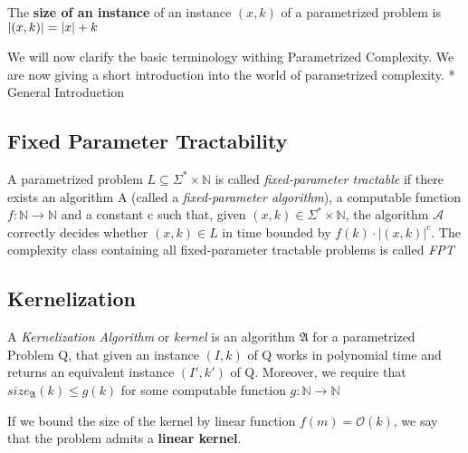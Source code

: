 \begin{definition}
    The \textbf{size of an instance} of an instance $(x,k)$ of a parametrized problem is $\abs{(x,k)} = \abs{x} + k$
\end{definition}
We will now clarify the basic terminology withing Parametrized Complexity. 
We are now giving a short introduction into the world of parametrized complexity. 
* General Introduction


\subsection{Fixed Parameter Tractability}

\begin{definition} 
    A parametrized problem $L\subseteq\Sigma^*\times\mathbb{N}$ is called \textit{fixed-parameter tractable} if there exists an algorithm A (called a \textit{fixed-parameter algorithm}), a computable function $f:\mathbb{N} \rightarrow \mathbb{N}$ and a constant c such that, given $(x,k) \in \Sigma^* \times \mathbb{N}$, the algorithm $\mathcal{A}$ correctly decides whether $(x,k) \in L$ in time bounded by $f(k) \cdot |(x,k)|^c$. The complexity class containing all fixed-parameter tractable problems is called \textit{FPT}
\end{definition}


\subsection{Kernelization}

\begin{definition}
A \textit{Kernelization Algorithm} or \textit{kernel} is an algorithm $\mathfrak{A}$ for a parametrized Problem Q, that given an instance $(I,k)$ of Q works in polynomial time and returns an equivalent instance $(I', k')$ of Q. Moreover, we require that $size_{\mathfrak{A}}(k) \leq g(k)$ for some computable function $g:\mathbb{N} \rightarrow \mathbb{N}$
\end{definition}

If we bound the size of the kernel by linear function $f(m) = \mathcal{O}(k)$, we say that the problem admits a \textbf{linear kernel}. 


